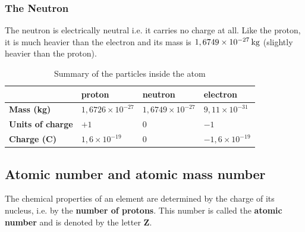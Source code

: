             \subsubsection*{The Neutron}
            \nopagebreak
          \label{m38745*id254468}The neutron is electrically neutral i.e. it carries no charge at all.
Like the proton, it is much heavier than the electron and its mass is $1,6749\ensuremath{\times}{10}^{-27}\phantom{\rule{2pt}{0ex}}\text{kg}$ (slightly heavier than the proton).\par 
\label{m38745*notfhsst!!!underscore!!!id214}
          \begin{table}[H]
        \begin{center}
      \label{m38745*uid14}
    \noindent
      \begin{tabular}{|l|l|l|l|}\hline
         &
                    \textbf{proton}
                   &
                    \textbf{neutron}
                   &
                    \textbf{electron} \\ \hline
                    \textbf{Mass (kg)}
                   &
        $1,6726\ensuremath{\times}{10}^{-27}$ &
        $1,6749\ensuremath{\times}{10}^{-27}$ &
        $9,11\ensuremath{\times}{10}^{-31}$ \\ \hline
                    \textbf{Units of charge}
                   &
        $+1$ &
        $0$ &
        $-1$ \\ \hline
                    \textbf{Charge (C)}
                   &
        $1,6\ensuremath{\times}{10}^{-19}$ &
        $0$ &
        $-1,6\ensuremath{\times}{10}^{-19}$ \\ \hline
    \end{tabular}
      \end{center}
    \caption{Summary of the particles inside the atom}
\end{table}
    \par
    \label{m38745*cid5}
            \subsection*{Atomic number and atomic mass number}
            \nopagebreak
      \label{m38745*id255805}The chemical properties of an element are determined by the charge of
its nucleus, i.e. by the \textbf{number of protons}. This number is
called the \textbf{atomic number} and is denoted by the letter \textbf{Z}.\par 



